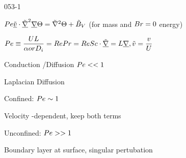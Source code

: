 \begin{mitframe}{053-1}
 \begin{listone}
	\item $\peclet\uline{\tilde{\vvel}}\cdot\tilde{\gradop}^2\gradop\dimltemp=\tilde{\nabla}^2\dimltemp+\tilde{\exergy}_{\vol}
    $ (for mass and $\brinkman=0$ energy)
   \item $\peclet\equiv\dfrac{\uvel\length}{\tdiff or \pdiff}=\reynolds\prandtl=\reynolds\schmidt\cdot\tilde{\gradop}=\length\gradop,\tilde{\vvel}=\dfrac{\vvel}{\uvel}$
   \item Conduction /Diffusion $\peclet<<1$
   		\begin{listtwo}
        	\item Laplacian Diffusion
        \end{listtwo}
   \item Confined: $\peclet\sim{1}$
   		\begin{listtwo}
        	\item Velocity -dependent, keep both terms
        \end{listtwo}
\item Unconfined: $\peclet>>{1}$
		\begin{listtwo}
        	\item Boundary layer at surface, singular pertubation
        \end{listtwo}
\end{listone}   
\end{mitframe}